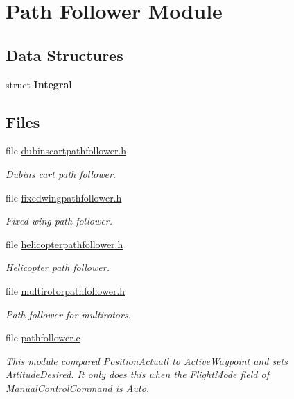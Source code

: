 \hypertarget{group___path_follower_module}{\section{\-Path \-Follower \-Module}
\label{group___path_follower_module}
}
\subsection*{\-Data \-Structures}
\begin{DoxyCompactItemize}
\item 
struct {\bfseries \-Integral}
\end{DoxyCompactItemize}
\subsection*{\-Files}
\begin{DoxyCompactItemize}
\item 
file \hyperlink{dubinscartpathfollower_8h}{dubinscartpathfollower.\-h}
\begin{DoxyCompactList}\small\item\em \-Dubins cart path follower. \end{DoxyCompactList}\item 
file \hyperlink{fixedwingpathfollower_8h}{fixedwingpathfollower.\-h}
\begin{DoxyCompactList}\small\item\em \-Fixed wing path follower. \end{DoxyCompactList}\item 
file \hyperlink{helicopterpathfollower_8h}{helicopterpathfollower.\-h}
\begin{DoxyCompactList}\small\item\em \-Helicopter path follower. \end{DoxyCompactList}\item 
file \hyperlink{multirotorpathfollower_8h}{multirotorpathfollower.\-h}
\begin{DoxyCompactList}\small\item\em \-Path follower for multirotors. \end{DoxyCompactList}\item 
file \hyperlink{pathfollower_8c}{pathfollower.\-c}
\begin{DoxyCompactList}\small\item\em \-This module compared \-Position\-Actuatl to \-Active\-Waypoint and sets \-Attitude\-Desired. \-It only does this when the \-Flight\-Mode field of \hyperlink{group___manual_control_command}{\-Manual\-Control\-Command} is \-Auto. \end{DoxyCompactList}\end{DoxyCompactItemize}
